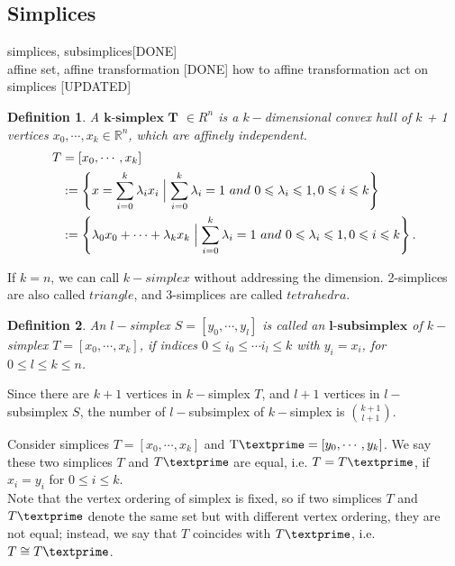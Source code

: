 \documentclass{article}
\newtheorem*{definition*}{Definition}
\begin{document}
    \subsection{Simplices}
    simplices, subsimplices[DONE]\\
    affine set, affine transformation [DONE]
    how to affine transformation act on simplices [UPDATED]\\

    \noindent
    \begin{definition*}
    A $\textbf{k-simplex T}$ $\in{R}^n$ is a ${k-}$dimensional convex hull of ${k}$ + 1 vertices ${x}_0, \cdots, {x}_k \in \mathbb{R}^n$, which are affinely independent.\\
    \begin{equation*}
    \begin{split}
    {T} & = [{x}_0, \cdots, {x}_k ]\\
    & := \left\{{x} = \sum\limits_{i=0}^k \lambda_i {x}_i \Bigm| \sum\limits_{i=0}^k \lambda_i = 1 ~and~ 0 \leqslant \lambda_i \leqslant 1, 0 \leqslant i \leqslant k \right\}\\
    & := \left\{\lambda_0{x}_0 + \cdots + \lambda_k{x}_k \Bigm| \sum\limits_{i=0}^k \lambda_i = 1 ~and~ 0 \leqslant \lambda_i \leqslant 1, 0 \leqslant i \leqslant k \right\}.
    \end{split}
    \end{equation*}
    \end{definition*}
    If ${k} = n$, we can call ${k-simplex}$ without addressing the dimension. 2-simplices are also called ${triangle}$, and 3-simplices are called ${tetrahedra}$.

    \begin{definition*}
    An ${l-}$simplex ${S} = [{y}_0, \cdots, {y}_l]$ is called an $\textbf{l-subsimplex}$ of ${k-}$simplex ${T} = [{x}_0, \cdots, {x}_k]$, if indices $0 \leqslant {i}_0 \leqslant \cdots {i}_l \leqslant k$ with ${y}_i = {x}_i$, for $0 \leqslant l \leqslant k \leqslant n$.
    \end{definition*}
    Since there are $k+1$ vertices in ${k-}$simplex ${T}$, and $l+1$ vertices in ${l-}$subsimplex ${S}$, the number of ${l-}$subsimplex of ${k-}$simplex is $\binom{k+1}{l+1}$.


    Consider simplices ${T} = [{x}_0, \cdots, {x}_k]$ and $\text{T\textprime} = [{y}_0, \cdots, {y}_k]$. We say these two simplices ${T}$ and ${T\textprime}$ are equal, i.e. ${T} = {T\textprime}$, if ${x}_i = {y}_i$ for $0 \leqslant i \leqslant k$. \\
    Note that the vertex ordering of simplex is fixed, so if two simplices ${T}$ and ${T\textprime}$ denote the same set but with different vertex ordering, they are not equal; instead, we say that ${T}$ coincides with ${T\textprime}$, i.e. ${T} \cong {T\textprime}$.
\end{document}

